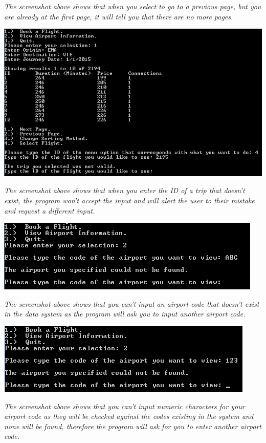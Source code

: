 \documentclass[10pt, a4paper]{article}
\begin{document}
\textit{The screenshot above shows that when you select to go to a previous page, but you are already at the first page, it will tell you that there are no more pages.}

\includegraphics{Validation17.png}

\textit{The screenshot above shows that when you enter the ID of a trip that doesn't exist, the program won't accept the input and will alert the user to their mistake and request a different input.}

\includegraphics{Validation18.png}

\textit{The screenshot above shows that you can't input an airport code that doesn't exist in the data system as the program will ask you to input another airport code.}

\includegraphics{Validation19.png}

\textit{The screenshot above shows that you can't input numeric characters for your airport code as they will be checked against the codes existing in the system and none will be found, therefore the program will ask for you to enter another airport code.}
\end{document}
